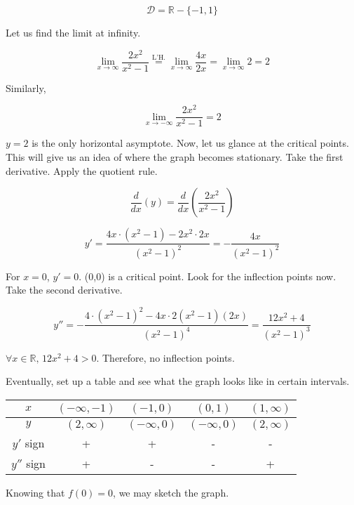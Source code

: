 \documentclass{article}
\begin{document}
\[\mathcal{D} = \mathbb{R} - \{-1, 1\} \]

\hfill

\noindent Let us find the limit at infinity.

\[\lim_{x\to \infty} \frac{2x^2}{x^2-1} \overset{\text{L'H.}}{=} \lim_{x\to \infty} \frac{4x}{2x} = \lim_{x\to \infty} 2 = 2\]

\noindent Similarly,

\[\lim_{x\to -\infty} \frac{2x^2}{x^2-1} = 2\]

\hfill

\noindent $y=2$ is the only horizontal asymptote. Now, let us glance at the critical points. This will give us an idea of where the graph becomes stationary. Take the first derivative. Apply the quotient rule.

\[\frac{d}{dx}(y) = \frac{d}{dx}\left(\frac{2x^2}{x^2-1}\right)\]

\[y' = \frac{4x\cdot(x^2-1) - 2x^2 \cdot 2x}{(x^2-1)^2} = -\frac{4x}{(x^2-1)^2} \]

\hfill

\noindent For $x=0$, $y'=0$. (0,0) is a critical point. Look for the inflection points now. Take the second derivative.

\[y'' = -\frac{4\cdot (x^2-1)^2 - 4x \cdot 2(x^2-1)(2x)}{(x^2-1)^4} = \frac{12x^2+4}{(x^2-1)^3} \]

\hfill

\noindent $\forall x \in \mathbb{R},\,12x^2+4 > 0$. Therefore, no inflection points.

\hfill

\noindent Eventually, set up a table and see what the graph looks like in certain intervals.

\begin{center}
    \large
    \begin{tabular}{ |c| c c c c| } 
    \hline
        $x$ & $(-\infty, -1)$ & $(-1, 0)$ & $(0, 1)$ &  $(1, \infty)$ \\
        \hline
        $y$ & $(2, \infty)$ & $(-\infty, 0)$ & $(-\infty, 0)$ & $(2, \infty)$\\
        \hline
        $y'$ sign & + & + & - & - \\
        \hline
        $y''$ sign & + & - & - & + \\
        \hline
    \end{tabular}
\end{center}

\hfill

\noindent Knowing that $f(0) = 0$, we may sketch the graph.
\end{document}
